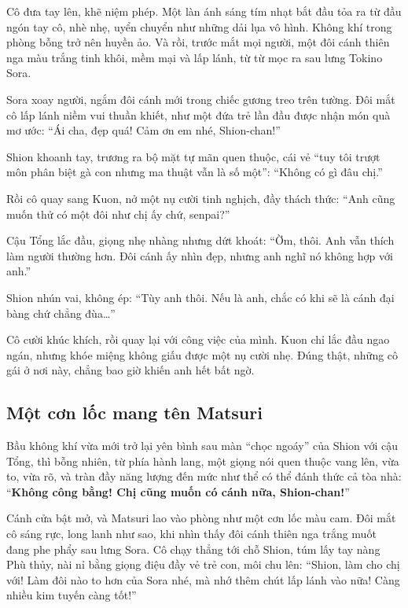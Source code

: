 \documentclass[../main.tex]{subfiles}
\begin{document}
Cô đưa tay lên, khẽ niệm phép. Một làn ánh sáng tím nhạt bắt đầu tỏa ra từ đầu ngón tay cô, nhè nhẹ, uyển chuyển như những dải lụa vô hình. Không khí trong phòng bỗng trở nên huyền ảo. Và rồi, trước mắt mọi người, một đôi cánh thiên nga màu trắng tinh khôi, mềm mại và lấp lánh, từ từ mọc ra sau lưng Tokino Sora.


Sora xoay người, ngắm đôi cánh mới trong chiếc gương treo trên tường. Đôi mắt cô lấp lánh niềm vui thuần khiết, như một đứa trẻ lần đầu được nhận món quà mơ ước: ``Ái cha, đẹp quá! Cảm ơn em nhé, Shion-chan!''

Shion khoanh tay, trương ra bộ mặt tự mãn quen thuộc, cái vẻ ``tuy tôi trượt môn phân biệt gà con nhưng ma thuật vẫn là số một'': ``Không có gì đâu chị.''

Rồi cô quay sang Kuon, nở một nụ cười tinh nghịch, đầy thách thức: ``Anh cũng muốn thử có một đôi như chị ấy chứ, senpai?''

Cậu Tổng lắc đầu, giọng nhẹ nhàng nhưng dứt khoát: ``Ờm, thôi. Anh vẫn thích làm người thường hơn. Đôi cánh ấy nhìn đẹp, nhưng anh nghĩ nó không hợp với anh.''

Shion nhún vai, không ép: ``Tùy anh thôi. Nếu là anh, chắc có khi sẽ là cánh đại bàng chứ chẳng đùa\dots''

Cô cười khúc khích, rồi quay lại với công việc của mình. Kuon chỉ lắc đầu ngao ngán, nhưng khóe miệng không giấu được một nụ cười nhẹ. Đúng thật, những cô gái ở nơi này, chẳng bao giờ khiến anh hết bất ngờ.

\subsection*{Một cơn lốc mang tên Matsuri}
Bầu không khí vừa mới trở lại yên bình sau màn ``chọc ngoáy'' của Shion với cậu Tổng, thì bỗng nhiên, từ phía hành lang, một giọng nói quen thuộc vang lên, vừa to, vừa rõ, và tràn đầy năng lượng đến mức như thể có thể đánh thức cả tòa nhà: ``\textbf{Không công bằng! Chị cũng muốn có cánh nữa, Shion-chan!}''

Cánh cửa bật mở, và Matsuri lao vào phòng như một cơn lốc màu cam. Đôi mắt cô sáng rực, long lanh như sao, khi nhìn thấy đôi cánh thiên nga trắng muốt đang phe phẩy sau lưng Sora. Cô chạy thẳng tới chỗ Shion, túm lấy tay nàng Phù thủy, nài nỉ bằng giọng điệu đầy vẻ trẻ con, môi chu lên: ``Shion, làm cho chị với! Làm đôi nào to hơn của Sora nhé, mà nhớ thêm chút lấp lánh vào nữa! Càng nhiều kim tuyến càng tốt!''
\end{document}

